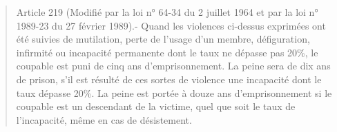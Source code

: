 \begin{quote}\small Article 219 (Modifié par la loi n° 64-34 du 2 juillet 1964 et par la loi n° 1989-23 du 27 février 1989).- Quand les violences ci-dessus exprimées ont été suivies de mutilation, perte de l'usage d'un membre, défiguration, infirmité ou incapacité permanente dont le taux ne dépasse pas 20\%, le coupable est puni de cinq ans d'emprisonnement. La peine sera de dix ans de prison, s'il est résulté de ces sortes de violence une incapacité dont le taux dépasse 20\%. La peine est portée à douze ans d'emprisonnement si le coupable est un descendant de la victime, quel que soit le taux de l'incapacité, même en cas de désistement.\end{quote}